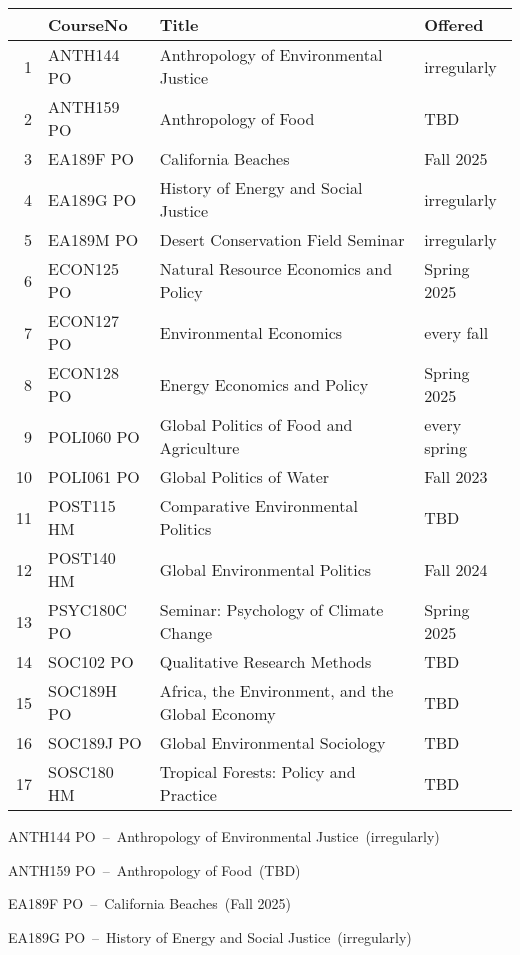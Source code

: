 \documentclass{article}\usepackage[]{graphicx}\usepackage[]{xcolor}
\newenvironment{itemize*}%
  {\begin{itemize}%
    \setlength{\itemsep}{0pt}%
    \setlength{\parskip}{0pt}}%
  {\end{itemize}}
\begin{document}
\begin{description}
\begin{table}[ht]
\centering
\begin{tabular}{rlll}
  \hline
 & CourseNo & Title & Offered \\ 
  \hline
1 & ANTH144 PO & Anthropology of Environmental Justice & irregularly \\ 
  2 & ANTH159 PO & Anthropology of Food & TBD \\ 
  3 & EA189F PO & California Beaches & Fall 2025 \\ 
  4 & EA189G PO & History of Energy and Social Justice & irregularly \\ 
  5 & EA189M PO & Desert Conservation Field Seminar & irregularly \\ 
  6 & ECON125 PO & Natural Resource Economics and Policy & Spring 2025 \\ 
  7 & ECON127 PO & Environmental Economics & every fall \\ 
  8 & ECON128 PO & Energy Economics and Policy & Spring 2025 \\ 
  9 & POLI060 PO & Global Politics of Food and Agriculture & every spring \\ 
  10 & POLI061 PO & Global Politics of Water & Fall 2023 \\ 
  11 & POST115 HM & Comparative Environmental Politics & TBD \\ 
  12 & POST140 HM & Global Environmental Politics & Fall 2024 \\ 
  13 & PSYC180C PO & Seminar: Psychology of Climate Change & Spring 2025 \\ 
  14 & SOC102 PO & Qualitative Research Methods & TBD \\ 
  15 & SOC189H PO & Africa, the Environment, and the Global Economy & TBD \\ 
  16 & SOC189J PO & Global Environmental Sociology & TBD \\ 
  17 & SOSC180 HM & Tropical Forests: Policy and Practice & TBD \\ 
   \hline
\end{tabular}
\end{table}


\begin{itemize*}
  \item ANTH144 PO~--~Anthropology of Environmental Justice~(irregularly)
  \item ANTH159 PO~--~Anthropology of Food~(TBD)
  \item EA189F PO~--~California Beaches~(Fall 2025)
  \item EA189G PO~--~History of Energy and Social Justice~(irregularly)
\end{itemize*}


\end{description}
\end{document}

